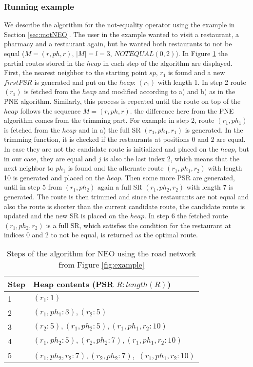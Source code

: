 \subsubsection{Running example}
We describe the algorithm for the not-equality operator using the example in Section \ref{sec:motNEO}. The user in the example wanted to visit a restaurant, a pharmacy and a restaurant again, but he wanted both restaurants to not be equal ($M = (r, ph, r)$, $|M| = l = 3$, $NOTEQUAL(0, 2)$). In Figure \ref{heapNEO} the partial routes stored in the $heap$ in each step of the algorithm are displayed.
First, the nearest neighbor to the starting point $sp$, $r_1$  is found and a new $firstPSR$ is generated and put on the $heap$: $(r_1)$ with length 1. In step 2 route $(r_1)$ is fetched from the $heap$ and modified according to a) and b) as in the PNE algorithm. Similarly, this process is repeated until the route on top of the $heap$ follows the sequence $M = (r, ph, r)$. the difference here from the PNE algorithm comes from the trimming part. For example in step 2, route $(r_1, ph_1)$ is fetched from the $heap$ and in a) the full SR $(r_1, ph_1, r_1)$ is generated. In the trimming function, it is checked if the restaurants at positions 0 and 2 are equal. In case they are not the candidate route is initialized and placed on the $heap$, but in our case, they are equal and $j$ is also the last index 2, which means that the next neighbor to $ph_1$ is found and the alternate route $(r_1, ph_1, r_2)$ with length 10 is generated and placed on the $heap$. Then some more PSR are generated, until in step 5 from $(r_1, ph_2)$ again a full SR $(r_1, ph_2, r_2)$ with length 7 is generated. The route is then trimmed and since the restaurants are not equal and also the route is shorter than the current candidate route, the candidate route is updated and the new SR is placed on the $heap$. In step 6 the fetched route $(r_1, ph_2, r_2)$ is a full SR, which satisfies the condition for the restaurant at indices 0 and 2 to not be equal, is returned as the optimal route.

\begin{table}[h]
	\centering
	\begin{tabular}{ |l|l| } 
		\hline
		Step & Heap contents (PSR $R : length(R)$) \\
		\hline
		1 & $(r_1 : 1)$ \\ 
		 \hline
		2 & $(r_1, ph_1 : 3), (r_2 : 5)$ \\ 
		\hline
		3 & $(r_2 : 5), (r_1, ph_2 : 5), (r_1, ph_1, r_2 : 10)$ \\ 
		\hline
		4 & $(r_1, ph_2 : 5), (r_2, ph_2 : 7), (r_1, ph_1, r_2 : 10)$ \\ 
		\hline
		5 & $(r_1, ph_2, r_2 : 7), (r_2, ph_2 : 7),$ \st{$(r_1, ph_1, r_2 : 10)$} \\ 
		\hline
	\end{tabular}
	\caption{Steps of the algorithm for NEO using the road network from Figure \ref{fig:example}}
	\label{heapNEO}
\end{table}

